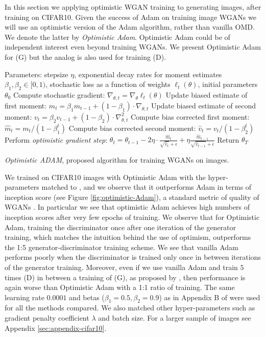 \vspace{-.1in}
In this section we applying optimistic WGAN training to generating images, after training on CIFAR10. Given the success of Adam on training image WGANs we will use an optimistic version of the Adam algorithm, rather than vanilla OMD. We denote the latter by \emph{Optimistic Adam}. Optimistic Adam could be of independent interest even beyond training WGANs. We present Optimistic Adam for (G) but the analog is also used for training (D).
\begin{algorithm}[h]
\begin{algorithmic}
\State Parameters: stepsize $\eta$, exponential decay rates for moment estimates $\beta_1, \beta_2\in [0,1)$, stochastic loss as a function of weights $\ell_t(\theta)$, initial parameters $\theta_0$
\State Compute stochastic gradient: $\nabla_{\theta,t} = \nabla_{\theta} \ell_t(\theta)$
\State Update biased estimate of first moment: $m_t = \beta_1 m_{t-1} + (1-\beta_1) \cdot \nabla_{\theta,t}$
\State Update biased estimate of second moment: $v_t = \beta_2 v_{t-1} + (1-\beta_2) \cdot \nabla_{\theta,t}^2$
\State Compute bias corrected first moment: $\hat{m}_t = m_t/(1 - \beta_1^t)$
\State Compute bias corrected second moment: $\hat{v}_t = v_t/(1 - \beta_2^t)$
\State Perform \emph{optimistic gradient step}: $\theta_t = \theta_{t-1} - 2 \eta \cdot \frac{\hat{m}_t}{\sqrt{\hat{v}_t}+\epsilon} + \eta \frac{\hat{m}_{t-1}}{\sqrt{\hat{v}_{t-1}}+\epsilon}$ 
\EndFor
\State Return $\theta_T$
\end{algorithmic}
\caption{\emph{Optimistic ADAM}, proposed algorithm for training WGANs on images. }\label{alg:opt-adam}
\end{algorithm}
\vspace{-.1in}
We trained on CIFAR10 images with Optimistic Adam with the hyper-parameters matched to \cite{Gulrajani2017}, and we observe that it outperforms Adam in terms of inception score (see Figure \ref{fig:optimistic-Adam}), a standard metric of quality of WGANs \citep{Gulrajani2017, salimans2016improved}. In particular we see that optimistic Adam achieves high numbers of inception scores after very few epochs of training. We observe that for Optimistic Adam, training the discriminator once after one iteration of the generator training, which matches the intuition behind the use of optimism, outperforms the 1:5 generator-discriminator training scheme. We see that vanilla Adam performs poorly when the discriminator is trained only once in between iterations of the generator training. Moreover, even if we use vanilla Adam and train $5$ times (D) in between a training of (G), as proposed by \cite{arjovsky2017wasserstein}, then performance is again worse than Optimistic Adam with a 1:1 ratio of training. The same learning rate $0.0001$ and betas ($\beta_1=0.5, \beta_2=0.9$) as in Appendix B of \cite{Gulrajani2017}  were used for all the methods compared. We also matched other hyper-parameters such as gradient penalty coefficient $\lambda$ and batch size. For a larger sample of images see Appendix \ref{sec:appendix-cifar10}. 
